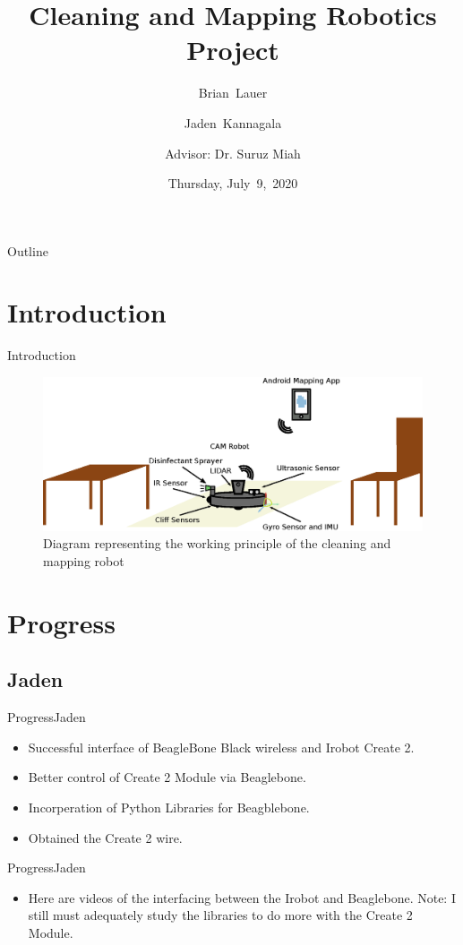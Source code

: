 \documentclass{beamer}
\title[Progress Update]{Cleaning and Mapping Robotics Project}
\author[B.~Lauer, J.~Kannagala]{Brian~Lauer \and Jaden~Kannagala \\\and
Advisor: Dr. Suruz Miah}
\institute[Bradley University] %
{
  Department of Electrical and Computer Engineering\\
  Bradley University\\
  1501 W. Bradley Avenue\\
  Peoria, IL, 61625, USA
}
\date[July~9,~2020]{Thursday, July~9,~2020}
\begin{document}
\begin{frame}
  \titlepage
\end{frame}

\begin{frame}{Outline}
  \tableofcontents
\end{frame}

\section{Introduction}
\begin{frame}{Introduction}{}
\begin{figure}
    \centering
    \includegraphics[scale=0.45]{figs/inkscape/mappingRobotArchitecture.eps}
    \caption{Diagram representing the working principle of the cleaning and mapping robot}
    \label{fig:my_label}
\end{figure}
\end{frame}

\section{Progress}
\subsection{Jaden}
\begin{frame}{Progress}{Jaden}
    \begin{itemize}
        \item Successful interface of BeagleBone Black wireless and Irobot Create 2.
       \item Better control of Create 2 Module via Beaglebone.
       \item Incorperation of Python Libraries for Beagblebone.
       \item Obtained the Create 2 wire.
    \end{itemize}
\end{frame}
\begin{frame}{Progress}{Jaden}
    \begin{itemize}
        \item Here are videos of the interfacing between the Irobot and Beaglebone. Note: I still must adequately study the libraries to do more with the Create 2 Module.
    \end{itemize}
\end{frame}
\end{document}
